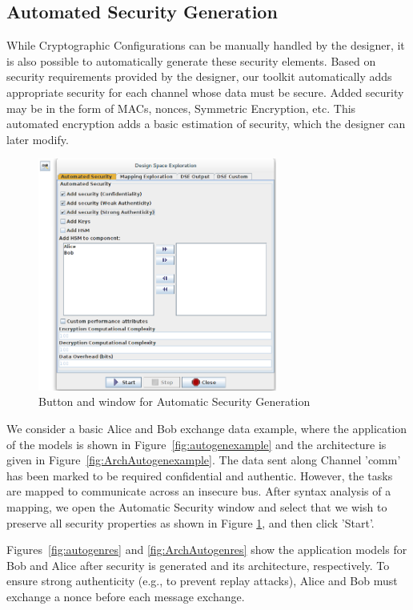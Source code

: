 \documentclass{llncs}
\begin{document}
\subsection{Automated Security Generation}

While Cryptographic Configurations can be manually handled by the designer,
it is also possible to automatically generate these security elements. Based on security requirements provided by the designer, our toolkit automatically adds appropriate security for each channel whose data must be secure. Added security may be in the form of MACs, nonces, Symmetric Encryption, etc. This automated encryption adds a basic estimation of security, which the designer can later modify.

\begin{figure}[htbp]
	\centering
 	\includegraphics[width=0.7\textwidth]{figures/securityStuff/autoSec.png}
	\caption{Button and window for Automatic Security Generation}
	\label{fig:autosec}
\end{figure}

We consider a basic Alice and Bob exchange data example, where the application of the models is shown in Figure~\ref{fig:autogenexample} and the architecture is given in Figure~\ref{fig:ArchAutogenexample}. The data sent along Channel 'comm' has been marked to be required confidential and authentic. However, the tasks are mapped to communicate across an insecure bus. After syntax analysis of a mapping, we open the Automatic Security window and select that we wish to preserve all security properties as shown in Figure \ref{fig:autosec}, and  then click 'Start'.

Figures~\ref{fig:autogenres} and \ref{fig:ArchAutogenres} show the application models for Bob and Alice after security is generated and its architecture, respectively. To ensure strong authenticity (e.g., to prevent replay attacks), Alice and Bob must exchange a nonce before each message exchange.
\end{document}
